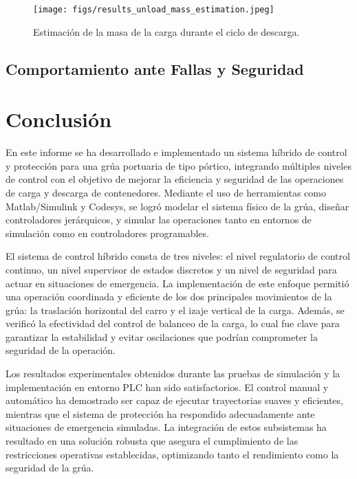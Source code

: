\documentclass{article}
\begin{document}
            \begin{figure} [H]
                \centering
                \texttt{[image: figs/results\_unload\_mass\_estimation.jpeg]}
                \caption{Estimación de la masa de la carga durante el ciclo de descarga.}
                \label{fig:results_unload_mass_estimation}
            \end{figure}



            

            

            
            \subsection{Comportamiento ante Fallas y Seguridad}

  


\section{Conclusión}\label{sec:conclusion}

    En este informe se ha desarrollado e implementado un sistema híbrido de control y protección para una grúa portuaria de tipo pórtico, integrando múltiples niveles de control con el objetivo de mejorar la eficiencia y seguridad de las operaciones de carga y descarga de contenedores. Mediante el uso de herramientas como Matlab/Simulink y Codesys, se logró modelar el sistema físico de la grúa, diseñar controladores jerárquicos, y simular las operaciones tanto en entornos de simulación como en controladores programables.

    El sistema de control híbrido consta de tres niveles: el nivel regulatorio de control continuo, un nivel supervisor de estados discretos y un nivel de seguridad para actuar en situaciones de emergencia. La implementación de este enfoque permitió una operación coordinada y eficiente de los dos principales movimientos de la grúa: la traslación horizontal del carro y el izaje vertical de la carga. Además, se verificó la efectividad del control de balanceo de la carga, lo cual fue clave para garantizar la estabilidad y evitar oscilaciones que podrían comprometer la seguridad de la operación.

    Los resultados experimentales obtenidos durante las pruebas de simulación y la implementación en entorno PLC han sido satisfactorios. El control manual y automático ha demostrado ser capaz de ejecutar trayectorias suaves y eficientes, mientras que el sistema de protección ha respondido adecuadamente ante situaciones de emergencia simuladas. La integración de estos subsistemas ha resultado en una solución robusta que asegura el cumplimiento de las restricciones operativas establecidas, optimizando tanto el rendimiento como la seguridad de la grúa.
\end{document}
